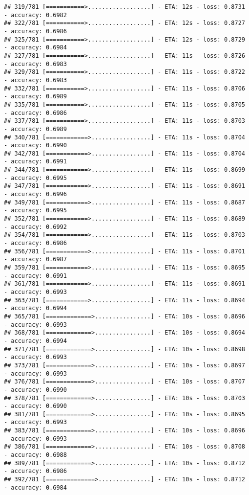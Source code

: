 \documentclass[
]{article}
\begin{document}
\begin{verbatim}
## 319/781 [===========>..................] - ETA: 12s - loss: 0.8731 - accuracy: 0.6982
## 322/781 [===========>..................] - ETA: 12s - loss: 0.8727 - accuracy: 0.6986
## 325/781 [===========>..................] - ETA: 12s - loss: 0.8729 - accuracy: 0.6984
## 327/781 [===========>..................] - ETA: 11s - loss: 0.8726 - accuracy: 0.6983
## 329/781 [===========>..................] - ETA: 11s - loss: 0.8722 - accuracy: 0.6983
## 332/781 [===========>..................] - ETA: 11s - loss: 0.8706 - accuracy: 0.6989
## 335/781 [===========>..................] - ETA: 11s - loss: 0.8705 - accuracy: 0.6986
## 337/781 [===========>..................] - ETA: 11s - loss: 0.8703 - accuracy: 0.6989
## 340/781 [============>.................] - ETA: 11s - loss: 0.8704 - accuracy: 0.6990
## 342/781 [============>.................] - ETA: 11s - loss: 0.8704 - accuracy: 0.6991
## 344/781 [============>.................] - ETA: 11s - loss: 0.8699 - accuracy: 0.6995
## 347/781 [============>.................] - ETA: 11s - loss: 0.8691 - accuracy: 0.6996
## 349/781 [============>.................] - ETA: 11s - loss: 0.8687 - accuracy: 0.6995
## 352/781 [============>.................] - ETA: 11s - loss: 0.8689 - accuracy: 0.6992
## 354/781 [============>.................] - ETA: 11s - loss: 0.8703 - accuracy: 0.6986
## 356/781 [============>.................] - ETA: 11s - loss: 0.8701 - accuracy: 0.6987
## 359/781 [============>.................] - ETA: 11s - loss: 0.8695 - accuracy: 0.6991
## 361/781 [============>.................] - ETA: 11s - loss: 0.8691 - accuracy: 0.6993
## 363/781 [============>.................] - ETA: 11s - loss: 0.8694 - accuracy: 0.6994
## 365/781 [=============>................] - ETA: 10s - loss: 0.8696 - accuracy: 0.6993
## 368/781 [=============>................] - ETA: 10s - loss: 0.8694 - accuracy: 0.6994
## 371/781 [=============>................] - ETA: 10s - loss: 0.8698 - accuracy: 0.6993
## 373/781 [=============>................] - ETA: 10s - loss: 0.8697 - accuracy: 0.6993
## 376/781 [=============>................] - ETA: 10s - loss: 0.8707 - accuracy: 0.6990
## 378/781 [=============>................] - ETA: 10s - loss: 0.8703 - accuracy: 0.6990
## 381/781 [=============>................] - ETA: 10s - loss: 0.8695 - accuracy: 0.6993
## 383/781 [=============>................] - ETA: 10s - loss: 0.8696 - accuracy: 0.6993
## 386/781 [=============>................] - ETA: 10s - loss: 0.8708 - accuracy: 0.6988
## 389/781 [=============>................] - ETA: 10s - loss: 0.8712 - accuracy: 0.6986
## 392/781 [==============>...............] - ETA: 10s - loss: 0.8712 - accuracy: 0.6984

\end{verbatim}
\end{document}
